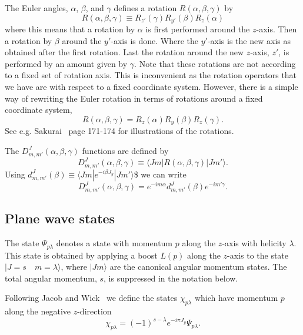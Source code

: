 The Euler angles, $\alpha$, $\beta$, and $\gamma$ defines a 
rotation $R(\alpha,\beta,\gamma)$ by
\begin{equation}
R(\alpha,\beta,\gamma)\equiv R_{z'}(\gamma)R_{y'}(\beta)R_{z}(\alpha)
\end{equation}
where this means that a rotation by $\alpha$ is first performed around the 
$z$-axis. Then a rotation by $\beta$ around the $y'$-axis is done. Where
the $y'$-axis is the new axis as obtained after the first rotation.
Last the rotation around the new $z$-axis, $z'$, is performed by an
amount given by $\gamma$. Note that these rotations are not according to
a fixed set of rotation axis. This is inconvenient as the rotation operators
that we have are with respect to a fixed coordinate system. However, 
there is a simple way of rewriting the Euler rotation in terms of
rotations around a fixed coordinate system,
\begin{equation}
R(\alpha,\beta,\gamma)=R_{z}(\alpha)R_{y}(\beta)R_{z}(\gamma).
\end{equation}
See e.g. Sakurai~\cite{Sakurai} page 171-174 for illustrations of the
rotations.

The $D^{J}_{m,m'}(\alpha,\beta,\gamma)$ functions are defined by
\begin{equation}
D^{J}_{m,m'}(\alpha,\beta,\gamma)\equiv 
             \langle Jm|R(\alpha,\beta,\gamma)|Jm'\rangle.
\end{equation}
Using $d^{J}_{m,m'}(\beta)\equiv \langle Jm|e^{-i\beta J_y}|Jm'\rangle$\$ we
can write
\begin{equation}
D^{J}_{m,m'}(\alpha,\beta,\gamma)=
       e^{-im\alpha}d^{J}_{m,m'}(\beta)e^{-im'\gamma}.
\end{equation}

\subsection{Plane wave states}

The state $\Psi_{p\lambda}$ denotes a state with momentum $p$
along the $z$-axis with helicity $\lambda$. This state is obtained
by applying a boost $L(p)$ along the $z$-axis to the state 
$|J=s\quad m=\lambda\rangle$, where $|J m\rangle$ are the 
canonical angular momentum states. The total angular momentum,
$s$, is suppressed in the notation below.

Following Jacob and Wick~\cite{Jaco59} we define the states $\chi_{p\lambda}$
which have momentum $p$ along the negative $z$-direction
\begin{equation}
\chi_{p\lambda}=(-1)^{s-\lambda}e^{-i\pi J_y}\Psi_{p\lambda}.
\end{equation}

